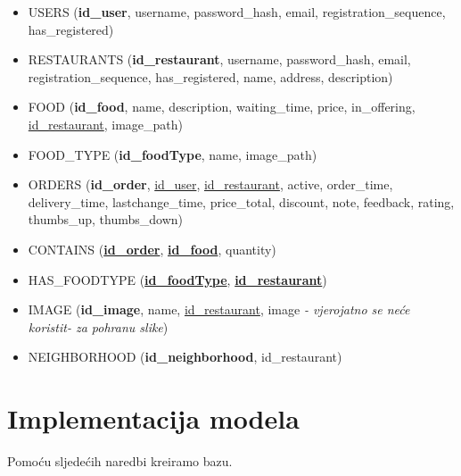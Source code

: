 \documentclass[12pt]{scrartcl}
\begin{document}
\begin{itemize}
    \item[] \textsf{USERS (\textbf{id\_user}, username, password\_hash, email, registration\_sequence, \\has\_registered)}
    \item[] \textsf{RESTAURANTS (\textbf{id\_restaurant}, username, password\_hash, email, \\registration\_sequence, has\_registered, name, address, description)}
    \item[] \textsf{FOOD (\textbf{id\_food}, name, description, waiting\_time, price, in\_offering, \underline{id\_restaurant}, image\_path)}
    \item[] \textsf{FOOD\_TYPE (\textbf{id\_foodType}, name, image\_path)}
    \item[] \textsf{ORDERS (\textbf{id\_order}, \underline{id\_user}, \underline{id\_restaurant}, active, order\_time, delivery\_time, lastchange\_time, price\_total, discount, note, feedback, rating, thumbs\_up, thumbs\_down)}
    \item[] \textsf{CONTAINS (\textbf{\underline{id\_order}}, \textbf{\underline{id\_food}}, quantity)}
    \item[] \textsf{HAS\_FOODTYPE (\textbf{\underline{id\_foodType}}, \textbf{\underline{id\_restaurant}})}
    \item[] \textsf{IMAGE (\textbf{id\_image}, name, \underline{id\_restaurant}, image \emph{- vjerojatno se neće koristit- za pohranu slike})}
    \item[] \textsf{NEIGHBORHOOD (\textbf{id\_neighborhood}, id\_restaurant)}

\end{itemize}

\pagebreak[3]

\section{Implementacija modela}

Pomoću sljedećih naredbi kreiramo bazu.
\end{document}
